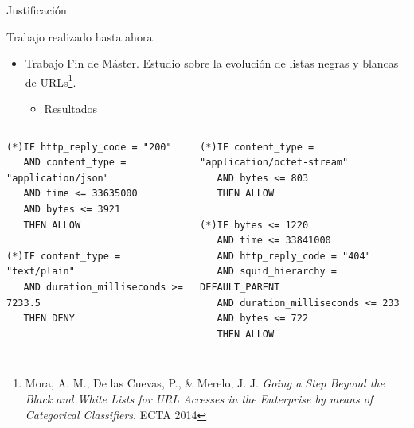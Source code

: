 \documentclass{beamer}
\begin{document}
\begin{frame}[fragile]{Justificación}

Trabajo realizado hasta ahora:

\begin{itemize}
  \item Trabajo Fin de Máster. Estudio sobre la evolución de listas negras y blancas de URLs\footnote{{\scriptsize Mora, A. M., De las Cuevas, P., \& Merelo, J. J. \textit{Going a Step Beyond the Black and White Lists for URL Accesses in the Enterprise by means of Categorical Classifiers}. ECTA 2014}}.
  \begin{itemize}
    \item Resultados
  \end{itemize}
\end{itemize}

\begin{columns}
  \begin{column}{.5\textwidth}
\begin{tiny}
\begin{verbatim}
(*)IF http_reply_code = "200"
   AND content_type = "application/json"
   AND time <= 33635000
   AND bytes <= 3921
   THEN ALLOW

(*)IF content_type = "text/plain"
   AND duration_milliseconds >= 7233.5
   THEN DENY
\end{verbatim}
\end{tiny}
  \end{column}
  \begin{column}{.5\textwidth}
\begin{tiny}
\begin{verbatim}
(*)IF content_type = "application/octet-stream"
   AND bytes <= 803
   THEN ALLOW

(*)IF bytes <= 1220
   AND time <= 33841000
   AND http_reply_code = "404"
   AND squid_hierarchy = DEFAULT_PARENT
   AND duration_milliseconds <= 233
   AND bytes <= 722
   THEN ALLOW
\end{verbatim}
\end{tiny}
  \end{column}
\end{columns}

\end{frame}
\end{document}

